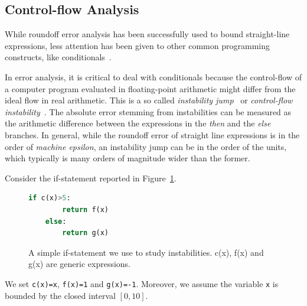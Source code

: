 \subsection{Control-flow Analysis}
%
While roundoff error analysis has been successfully used to bound straight-line expressions, less attention has been given to other common programming constructs, like conditionals~\cite{precisa, fluctuat}.
%

In error analysis, it is critical to deal with conditionals because the control-flow of a computer program evaluated in floating-point arithmetic might differ from the ideal flow in real arithmetic.
%
%
This is a so called \emph{instability jump}~\cite{satire} or \emph{control-flow instability}~\cite{unstable}.
%
The absolute error stemming from instabilities can be measured as the arithmetic difference between the expressions in the \emph{then} and the \emph{else} branches.
%
In general, while the roundoff error of straight line expressions is in the order of \emph{machine epsilon}, an instability jump can be in the order of the units, which typically is many orders of magnitude wider than the former.
%

Consider the if-statement reported in Figure~\ref{fig:ifstatement}. 
%
\begin{figure}[h!]
	\begin{lstlisting}[frame=single, language=Python]
	if c(x)>5:
		return f(x)
	else:
		return g(x)	
	\end{lstlisting}
	\caption{A simple if-statement we use to study instabilities. c(x), f(x) and g(x) are generic expressions.}\label{fig:ifstatement}
\end{figure}
%

We set \lstinline{c(x)=x}, \lstinline{f(x)=1} and \lstinline{g(x)=-1}.
%
Moreover, we assume the variable \lstinline{x} is bounded by the closed interval $[0,10]$.

